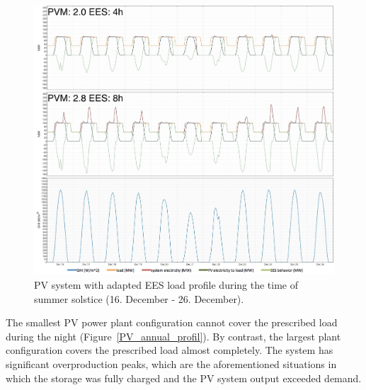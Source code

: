 \begin{figure}[htbp]
\centering
\includegraphics[width=1\linewidth]{FIG/PV_summer_load}
\caption[PV system with adapted EES load profile during the time of summer solstice.]{PV system with adapted EES load profile during the time of summer solstice (16. December - 26. December).}\label{PV_summer_load}
\end{figure}


The smallest PV power plant configuration cannot cover the prescribed load during the night (Figure~\ref{PV_annual_profil}). By contrast, the largest plant configuration covers the prescribed load almost completely. The system has significant overproduction peaks, which are the aforementioned situations in which the storage was fully charged and the PV system output exceeded demand.  


